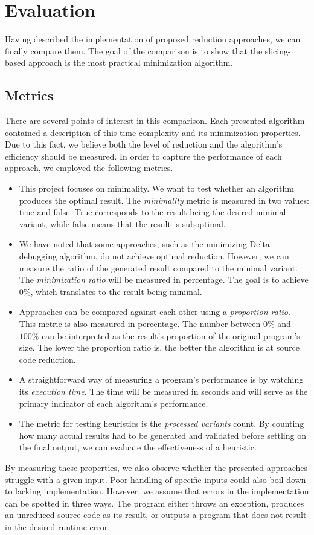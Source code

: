 \chapter{Evaluation}\label{chap:evaluation}

Having described the implementation of proposed reduction approaches, we can 
finally compare them. 
The goal of the comparison is to show that the slicing-based approach is 
the most practical minimization algorithm.

\section{Metrics}

There are several points of interest in this comparison. 
Each presented algorithm contained a description of this time complexity and 
its minimization properties. 
Due to this fact, we believe both the level of reduction and the algorithm's 
efficiency should be measured. 
In order to capture the performance of each approach, we employed 
the following metrics.
\begin{itemize}
\item This project focuses on minimality. 
  We want to test whether an algorithm produces the optimal result. 
  The \emph{minimality} metric is measured in two values: true and false. 
  True corresponds to the result being the desired minimal variant, while 
  false means that the result is suboptimal.
  \item We have noted that some approaches, such as the minimizing Delta 
  debugging algorithm, do not achieve optimal reduction. 
  However, we can measure the ratio of the generated result compared to 
  the minimal variant. 
  The \emph{minimization ratio} will be measured in percentage. 
  The goal is to achieve $0\%$, which translates to the result being minimal.
  \item{Approaches} can be compared against each other using 
  a \emph{proportion ratio}. 
  This metric is also measured in percentage. 
  The number between $0\%$ and $100\%$ can be interpreted as the result's 
  proportion of the original program's size. 
  The lower the proportion ratio is, the better the algorithm is at source 
  code reduction.
  \item A straightforward way of measuring a program's performance is by 
  watching its \emph{execution time}. 
  The time will be measured in seconds and will serve as the primary 
  indicator of each algorithm's performance.
  \item The metric for testing heuristics is the \emph{processed variants} 
  count. 
  By counting how many actual results had to be generated and validated 
  before settling on the final output, we can evaluate the effectiveness of 
  a heuristic.
\end{itemize}
By measuring these properties, we also observe whether the presented 
approaches struggle with a given input. 
Poor handling of specific inputs could also boil down to lacking 
implementation. 
However, we assume that errors in the implementation can be spotted in three 
ways. 
The program either throws an exception, produces an unreduced source code as 
its result, or outputs a program that does not result in the desired runtime 
error.


